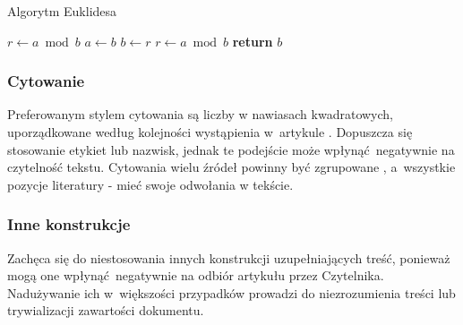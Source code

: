 \vspace{-4mm}
\begin{algorithm}
	\renewcommand{\thealgorithm}{} %
	\caption{Algorytm Euklidesa} \label{alg:euclid}
	\begin{algorithmic}[1]
		 
			\State $r\gets a\bmod b$
			 
				\State $a\gets b$
				\State $b\gets r$
				\State $r\gets a\bmod b$
			\EndWhile \label{alg:euclid:endwhile}
			\State \textbf{return} $b$
		\EndProcedure
	\end{algorithmic}
\end{algorithm}
\vspace{-8mm}

\subsubsection{Cytowanie}
\label{subsubsec:cite}

Preferowanym stylem cytowania są liczby w nawiasach kwadratowych, uporządkowane według kolejności wystąpienia w~artykule \cite{ref:lncs}. Dopuszcza się stosowanie etykiet lub nazwisk, jednak te podejście może wpłynąć negatywnie na czytelność tekstu. Cytowania wielu źródeł powinny być zgrupowane \cite{ref:lncs,ref:latex}, a~wszystkie pozycje literatury - mieć swoje odwołania w tekście.

\subsubsection{Inne konstrukcje}
\label{subsubsec:others}

Zachęca się do niestosowania innych konstrukcji uzupełniających treść, ponieważ mogą one wpłynąć negatywnie na odbiór artykułu przez Czytelnika. Nadużywanie ich w~większości przypadków prowadzi do niezrozumienia treści lub trywializacji zawartości dokumentu.
